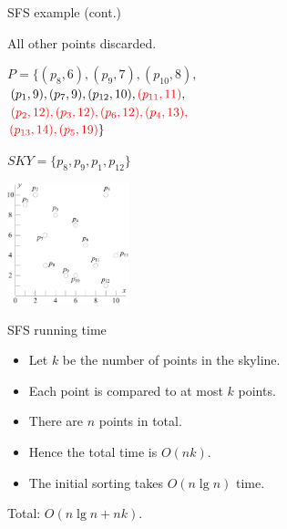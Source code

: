 \documentclass{beamer}
\def\vgap{\vspace{5mm}}
\newcommand{\red}[1]{\textcolor{red}{#1}}
\begin{document}
	\begin{frame}{SFS example (cont.)}
    \begin{small} \label{fra:sfs-sort}
		All other points discarded.

		\vgap

        \begin{minipage}[b]{0.5\linewidth}
            $P = \{(p_8, 6), (p_9, 7), (p_{10}, 8),$ \\
            $(p_1, 9), (p_7, 9), (p_{12}, 10), \red{(p_{11}, 11)},$ \\
            $\red{(p_2, 12), (p_3, 12), (p_6, 12), (p_4, 13),}$ \\
            $\red{(p_{13}, 14), (p_5, 19)}\}$ \vspace{10mm}

			$SKY = \{p_8, p_9, p_1, p_{12}\}$
        \end{minipage}
        \begin{minipage}[b]{0.45\linewidth}
            \begin{center}
                \includegraphics[height=35mm]{./artwork/data.pdf}
            \end{center}
        \end{minipage}
    \end{small}
    \end{frame}
\begin{frame}{SFS running time}
    \begin{small} \label{fra:sfs-sort}
		\begin{itemize}
		    \item Let $k$ be the number of points in the skyline.
			\item Each point is compared to at most $k$ points.
			\item There are $n$ points in total.
			\item Hence the total time is $O(nk)$.
			\item The initial sorting takes $O(n \lg n)$ time.
		\end{itemize}
		Total: $O(n \lg n + nk)$.
    \end{small}
    \end{frame}
\end{document}
